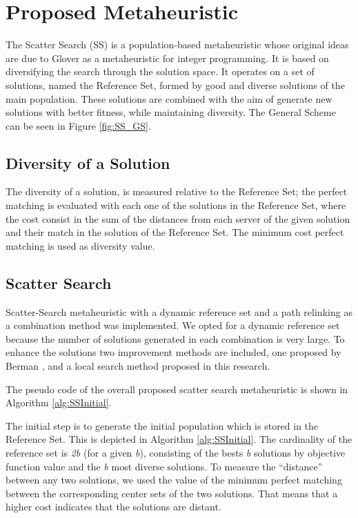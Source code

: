 \section{Proposed Metaheuristic}
The Scatter Search (SS)
is a population-based metaheuristic
whose original ideas are due to Glover \cite{glover1977heuristics}
as a metaheuristic for integer programming.
It is based on diversifying the search
through the solution space.
It operates on a set of solutions,
named the Reference Set,
formed by good and diverse solutions of the main population.
These solutions are combined
with the aim of generate
new solutions with better fitness,
while maintaining diversity.
The General Scheme can be seen in Figure \ref{fig:SS_GS}.


\subsection{Diversity of a Solution}
The diversity of a solution,
is measured relative to the Reference Set;
the perfect matching
is evaluated
with each one of the solutions in the Reference Set,
where the cost consist in
the sum of the distances
from each server of the given solution
and their match in the solution of the Reference Set.
The minimum cost perfect matching
is used as diversity value.

\subsection{Scatter Search}
Scatter-Search metaheuristic
with a dynamic reference set
and a path relinking
as a combination method
was implemented.
We opted for a dynamic reference set
because the number of solutions generated
in each combination is very large.
To enhance the solutions
two improvement methods are included,
one proposed by Berman \cite{berman1987stochastic},
and a local search method
proposed in this research.

The pseudo code
of the overall proposed scatter search metaheuristic
is shown in Algorithm \ref{alg:SSInitial}.

The initial step
is to generate the initial population
which is stored in the Reference Set.
This is depicted in Algorithm \ref{alg:SSInitial}.
The cardinality of the reference set is \textit{2b}
(for a given \textit{b}),
consisting of the bests \textit{b} solutions
by objective function value
and the \textit{b} most diverse solutions.
To measure the ``distance''
between any two solutions,
we used the value of the minimum perfect matching
between the corresponding center sets
of the two solutions.
That means that
a higher cost
indicates that
the solutions are distant.

